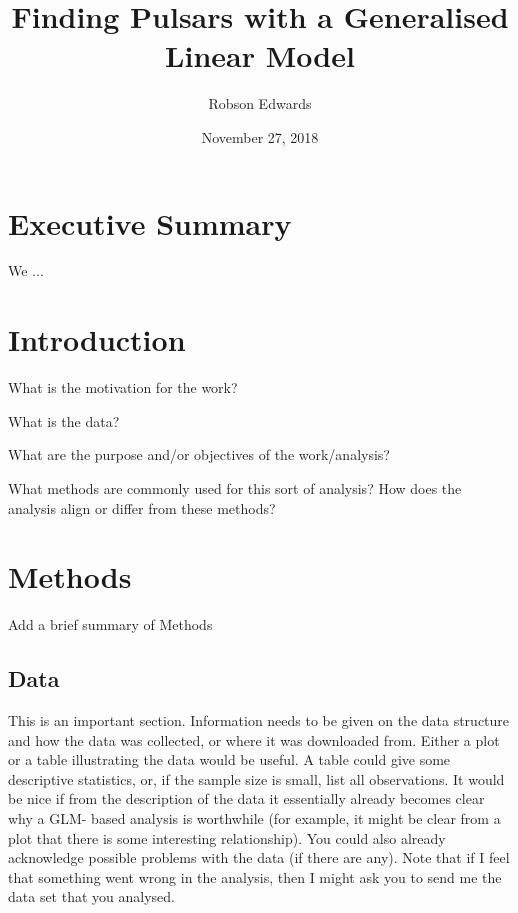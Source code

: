 \documentclass[11pt, oneside]{article}
\title{Finding Pulsars with a Generalised Linear Model}
\author{Robson Edwards}
\date{November 27, 2018}
\begin{document}
\maketitle


\section{Executive Summary}

We ...

\section{Introduction}

What is the motivation for the work?

What is the data? 

What are the purpose and/or objectives of the work/analysis?

What methods are commonly used for this sort of analysis? How does the analysis align or differ from these methods? 

\section{Methods}

Add a brief summary of Methods

\subsection{Data}

This is an important section. Information needs to be given on the data structure and how the data was collected, or where it was downloaded from. Either a plot or a table illustrating the data would be useful. A table could give some descriptive statistics, or, if the sample size is small, list all observations. It would be nice if from the description of the data it essentially already becomes clear why a GLM- based analysis is worthwhile (for example, it might be clear from a plot that there is some interesting relationship). You could also already acknowledge possible problems with the data (if there are any). Note that if I feel that something went wrong in the analysis, then I might ask you to send me the data set that you analysed.
\end{document}
